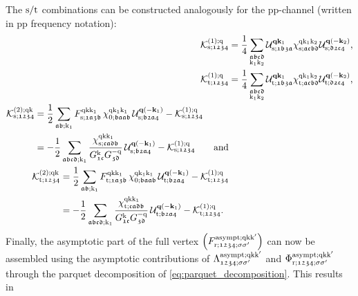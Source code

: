 \documentclass[../../main.tex]{subfiles}
\begin{document}
The $\text{s}/\text{t}$ combinations can be constructed analogously for the pp-channel (written in pp frequency notation):
\begin{subequations}\label{eq:kernel_functions_sing_trip}
\begin{align}
	\mathcal{K}^{(1);\text{q}}_{\text{s};\mathfrak{1234}}&=\frac14\sum_{\substack{\mathfrak{abcd}\\\text{k}_1\text{k}_2}} \mathcal{U}^{\textbf{q}\textbf{k}_1}_{\text{s};\mathfrak{1b3a}} \chi^{\text{q}\text{k}_1\text{k}_2}_{\text{s};\mathfrak{acbd}} \mathcal{U}^{\textbf{q}(-\textbf{k}_2)}_{\text{s};\mathfrak{d2c4}},\\
	\mathcal{K}^{(1);\text{q}}_{\text{t};\mathfrak{1234}}&=\frac14\sum_{\substack{\mathfrak{abcd}\\\text{k}_1\text{k}_2}} \mathcal{U}^{\textbf{q}\textbf{k}_1}_{\text{t};\mathfrak{1b3a}} \chi^{\text{q}\text{k}_1\text{k}_2}_{\text{t};\mathfrak{acbd}} \mathcal{U}^{\textbf{q}(-\textbf{k}_2)}_{\text{t};\mathfrak{d2c4}},\\
\begin{split}
	\mathcal{K}^{(2);\text{q}\text{k}}_{\text{s};\mathfrak{1234}}&=\frac12\sum_{\mathfrak{ab};\text{k}_1} F^{\text{q}\text{k}\text{k}_1}_{\text{s};\mathfrak{1a3b}}\,\chi^{\text{q}\text{k}_1\text{k}_1}_{0;\mathfrak{baab}}\,\mathcal{U}^{\textbf{q}(-\textbf{k}_1)}_{\text{s};\mathfrak{b2a4}}-\mathcal{K}^{(1);\text{q}}_{\text{s};\mathfrak{1234}}\\
	&=-\frac12\sum_{\mathfrak{abcd};\text{k}_1} \frac{\chi^{\text{q}\text{k}\text{k}_1}_{\text{s};\mathfrak{cadb}}}{G^{\text{k}}_{\mathfrak{1c}}G^{-\text{q}}_{\mathfrak{3d}}}\,\mathcal{U}^{\textbf{q}(-\textbf{k}_1)}_{\text{s};\mathfrak{b2a4}}-\mathcal{K}^{(1);\text{q}}_{\text{s};\mathfrak{1234}}\qquad\text{and}
\end{split}\\
\begin{split}
	\mathcal{K}^{(2);\text{q}\text{k}}_{\text{t};\mathfrak{1234}}&=\frac12\sum_{\mathfrak{ab};\text{k}_1} F^{\text{q}\text{k}\text{k}_1}_{\text{t};\mathfrak{1a3b}}\,\chi^{\text{q}\text{k}_1\text{k}_1}_{0;\mathfrak{baab}}\,\mathcal{U}^{\textbf{q}(-\textbf{k}_1)}_{\text{t};\mathfrak{b2a4}}-\mathcal{K}^{(1);\text{q}}_{\text{t};\mathfrak{1234}}\\
	&=-\frac12\sum_{\mathfrak{abcd};\text{k}_1} \frac{\chi^{\text{q}\text{k}\text{k}_1}_{\text{t};\mathfrak{cadb}}}{G^{\text{k}}_{\mathfrak{1c}}G^{-\text{q}}_{\mathfrak{3d}}}\,\mathcal{U}^{\textbf{q}(-\textbf{k}_1)}_{\text{t};\mathfrak{b2a4}}-\mathcal{K}^{(1);\text{q}}_{\text{t};\mathfrak{1234}}.
\end{split}
\end{align}	
\end{subequations}
Finally, the asymptotic part of the full vertex $\left (F_{\text{r};\mathfrak{1234};\sigma\sigma'}^{\text{asympt};\text{q}\text{k}\text{k}'}\right )$ can now be assembled using the asymptotic contributions of $\Lambda^{\text{asympt};\text{q}\text{k}\text{k}'}_{\mathfrak{1234};\sigma\sigma'}$ and $\Phi_{\text{r};\mathfrak{1234};\sigma\sigma'}^{\text{asympt};\text{q}\text{k}\text{k}'}$ through the parquet decomposition of \eqref{eq:parquet_decomposition}. This results in
\end{document}
